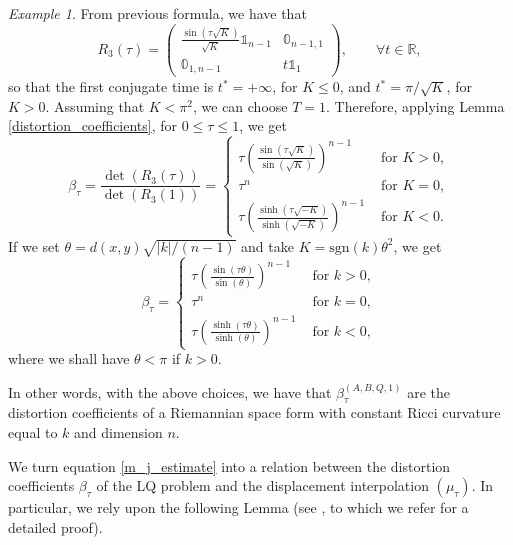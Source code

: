 \documentclass[reqno]{amsart}
\theoremstyle{plain}
\theoremstyle{definition}
\theoremstyle{remark}
\newtheorem{exmp}[thm]{Example}
\begin{document}
\begin{exmp}
			
			From previous formula, we have that 
			\begin{equation}
				R_3(\tau)=\begin{pmatrix}
					\frac{\sin(\tau\sqrt{K})}{\sqrt{K}}\mathbb{1}_{n-1}  & \mathbb{0}_{n-1,1}\\
					\mathbb{0}_{1,n-1} & t\mathbb{1}_1 
				\end{pmatrix},\qquad\forall t\in\mathbb{R},
			\end{equation}
			so that the first conjugate time is $t^*=+\infty$, for $K\leq 0$, and $t^*=\pi/\sqrt{K}$, for $K>0$. Assuming that $K<\pi^2$, we can choose $T=1$. Therefore, applying Lemma \ref{distortion_coefficients}, for $0\leq \tau\leq 1$, we get 
			\begin{equation}
				\beta_\tau=\frac{\det(R_3(\tau))}{\det(R_3(1))}=\begin{cases}
					\tau\left(\frac{\sin(\tau\sqrt{K})}{\sin(\sqrt{K})}\right)^{n-1}&\text{ for }K>0,\\
					\tau^n&\text{ for }K=0,\\
					\tau\left(\frac{\sinh(\tau\sqrt{-K})}{\sinh(\sqrt{-K})}\right)^{n-1}&\text{ for }K<0.
				\end{cases}
			\end{equation}
			If we set $\theta=d(x,y)\sqrt{|k|/(n-1)}$ and take $K=\mathrm{sgn}(k)\theta^2$, we get 
			\begin{equation}
				\beta_{\tau}=\begin{cases}
					\tau\left(\frac{\sin(\tau\theta)}{\sin(\theta)}\right)^{n-1}&\text{ for }k>0,\\
					\tau^n&\text{ for }k=0,\\
					\tau\left(\frac{\sinh(\tau\theta)}{\sinh(\theta)}\right)^{n-1}&\text{ for }k<0,
				\end{cases}
			\end{equation}
			where we shall have $\theta<\pi$ if $k>0$.
			
			In other words, with the above choices, we have that $\beta_\tau^{(A,B,Q,1)}$ are the distortion coefficients of a Riemannian space form with constant Ricci curvature equal to $k$ and dimension $n$.
		\end{exmp}
		
        
        We turn equation \eqref{m_j_estimate} into a relation between the distortion coefficients $\beta_\tau$ of the LQ problem and the displacement interpolation $(\mu_\tau)$. In particular, we rely upon the following Lemma (see \cite[Lemma 40]{SRintineq}, to which we refer for a detailed proof).
        
\end{document}
